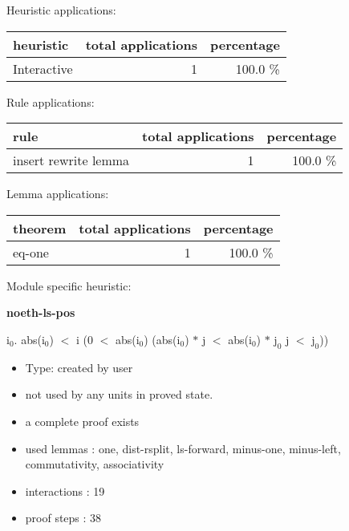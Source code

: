 \documentclass[a4paper]{article}
\begin{document}
\medskip


Heuristic applications:

\begin{supertabular}{l|r|r}
heuristic	& total applications & percentage \\ \hline
Interactive & 1 & 100.0 \% \\

\end{supertabular}

Rule applications:

\begin{supertabular}{l|r|r}
rule	        & total applications & percentage \\ \hline
insert rewrite lemma & 1 & 100.0 \% \\

\end{supertabular}

Lemma applications:

\begin{supertabular}{l|r|r}
theorem	        & total applications & percentage \\ \hline
eq-one & 1 & 100.0 \% \\

\end{supertabular}

Module specific heuristic:

\pagebreak

{\LARGE\bf noeth-ls-pos}\label{lemma-noeth-ls-pos}

\medskip

 \Fol \All $\mbox{i}_{0}$. abs($\mbox{i}_{0}$) $<$ i \Imp (0 $<$ abs($\mbox{i}_{0}$) \Imp (abs($\mbox{i}_{0}$) $*$ j $<$ abs($\mbox{i}_{0}$) $*$ $\mbox{j}_{0}$ \Equiv j $<$ $\mbox{j}_{0}$))

\begin{itemize}

\item Type: created by user

\item not used by any units in proved state.
\item       a complete proof exists
\item       used lemmas  : one, dist-rsplit, ls-forward, minus-one, minus-left, commutativity, associativity
\item       interactions : 19
\item       proof steps  : 38
\end{itemize}
\end{document}
